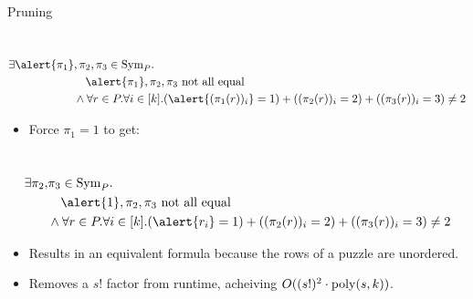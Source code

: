\documentclass[t,10pt,
mathserif,xcolor=dvipsnames]{beamer}
\begin{document}
\begin{myframe}{Pruning}

  ~\\[-5ex]
  \begin{equation*}
    \begin{aligned}
      \exists \alert{\pi_1}&,\pi_2, \pi_3 \in \Sym{P}.\\
      &~~~\alert{\pi_1}, \pi_2, \pi_3 \text{ not all equal}\\
      &\wedge \forall r \in P. \forall i \in [k]. (\alert{(\pi_1(r))_i} = 1) + ((\pi_2(r))_i = 2) + ((\pi_3(r))_i = 3) \neq 2
    \end{aligned}
  \end{equation*}

  \begin{itemize}
  \item Force $\pi_1 = 1$ to get:
  \end{itemize}

  ~\\[-5ex]
  \begin{equation*}
    \begin{aligned}
      \exists \pi_2,&\pi_3 \in \Sym{P}.\\
      &~~~\alert{1}, \pi_2, \pi_3 \text{ not all equal}\\
      &\wedge \forall r \in P. \forall i \in [k]. (\alert{r_i} = 1) + ((\pi_2(r))_i = 2) + ((\pi_3(r))_i = 3) \neq 2
    \end{aligned}
  \end{equation*}
  
  \begin{itemize}
  \item Results in an equivalent formula because the rows of a puzzle
    are unordered.
  \item Removes a $s!$ factor from runtime, acheiving $O((s!)^2 \cdot
    \mathrm{poly}(s,k))$.
  \end{itemize}


  
\end{myframe}
\end{document}
